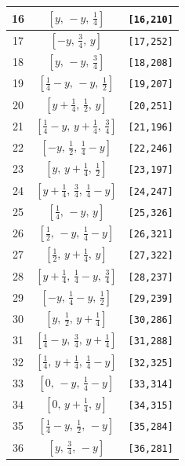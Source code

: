 \documentclass[fleqn,8pt]{jsarticle}
\begin{document}
\begin{longtable}{ccc}
16 & $\left[ y,\, - y,\, \frac{1}{4} \right]$ & {\tt [16,210]} \\ \hline
17 & $\left[ - y,\, \frac{3}{4},\, y \right]$ & {\tt [17,252]} \\ \hline
18 & $\left[ y,\, - y,\, \frac{3}{4} \right]$ & {\tt [18,208]} \\ \hline
19 & $\left[ \frac{1}{4} - y,\, - y,\, \frac{1}{2} \right]$ & {\tt [19,207]} \\ \hline
20 & $\left[ y + \frac{1}{4},\, \frac{1}{2},\, y \right]$ & {\tt [20,251]} \\ \hline
21 & $\left[ \frac{1}{4} - y,\, y + \frac{1}{4},\, \frac{3}{4} \right]$ & {\tt [21,196]} \\ \hline
22 & $\left[ - y,\, \frac{1}{2},\, \frac{1}{4} - y \right]$ & {\tt [22,246]} \\ \hline
23 & $\left[ y,\, y + \frac{1}{4},\, \frac{1}{2} \right]$ & {\tt [23,197]} \\ \hline
24 & $\left[ y + \frac{1}{4},\, \frac{3}{4},\, \frac{1}{4} - y \right]$ & {\tt [24,247]} \\ \hline
25 & $\left[ \frac{1}{4},\, - y,\, y \right]$ & {\tt [25,326]} \\ \hline
26 & $\left[ \frac{1}{2},\, - y,\, \frac{1}{4} - y \right]$ & {\tt [26,321]} \\ \hline
27 & $\left[ \frac{1}{2},\, y + \frac{1}{4},\, y \right]$ & {\tt [27,322]} \\ \hline
28 & $\left[ y + \frac{1}{4},\, \frac{1}{4} - y,\, \frac{3}{4} \right]$ & {\tt [28,237]} \\ \hline
29 & $\left[ - y,\, \frac{1}{4} - y,\, \frac{1}{2} \right]$ & {\tt [29,239]} \\ \hline
30 & $\left[ y,\, \frac{1}{2},\, y + \frac{1}{4} \right]$ & {\tt [30,286]} \\ \hline
31 & $\left[ \frac{1}{4} - y,\, \frac{3}{4},\, y + \frac{1}{4} \right]$ & {\tt [31,288]} \\ \hline
32 & $\left[ \frac{1}{4},\, y + \frac{1}{4},\, \frac{1}{4} - y \right]$ & {\tt [32,325]} \\ \hline
33 & $\left[ 0,\, - y,\, \frac{1}{4} - y \right]$ & {\tt [33,314]} \\ \hline
34 & $\left[ 0,\, y + \frac{1}{4},\, y \right]$ & {\tt [34,315]} \\ \hline
35 & $\left[ \frac{1}{4} - y,\, \frac{1}{2},\, - y \right]$ & {\tt [35,284]} \\ \hline
36 & $\left[ y,\, \frac{3}{4},\, - y \right]$ & {\tt [36,281]} \\ \hline

\end{longtable}
\end{document}
